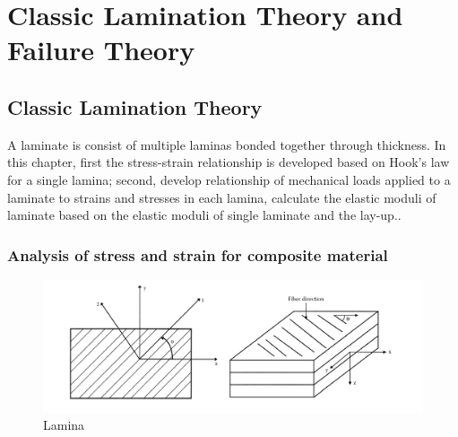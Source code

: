 
\chapter{Classic Lamination Theory and Failure Theory} %

\label{Chapter2} %


\section{Classic Lamination Theory}
A laminate is consist of multiple laminas bonded together through thickness. In
this chapter, first the stress-strain relationship is developed based on Hook's
law for a single lamina; second, develop relationship of mechanical loads
applied to a laminate to strains and stresses in each lamina, calculate the
elastic moduli of laminate based on the elastic moduli of single laminate and
the lay-up..


\subsection{Analysis of stress and strain for composite material}

\begin{figure}[!htb]
	\centering
	\includegraphics[width=\linewidth]{../../image/laminate_design/lamina_local_global_axes.png}
\caption{Lamina}
  	\label{fig:lamina}
\end{figure}

